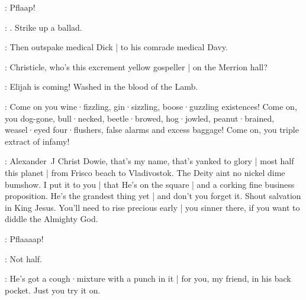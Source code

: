 :
Pflaap!

\stephen:
.
Strike up a ballad.

:
Then outspake medical Dick |
to his comrade medical Davy.

\bystander:
Christicle,
who's this excrement yellow gospeller |
on the Merrion hall?

\dowie:
Elijah is coming!
Washed in the blood of the Lamb.

\dowie:
Come on you wine·fizzling,
gin·sizzling,
boose·guzzling existences!
Come on,
you dog-gone,
bull·necked,
beetle·browed,
hog·jowled,
peanut·brained,
weasel·eyed four·flushers,
false alarms and excess baggage!
Come on,
you triple extract of infamy!

\dowie:
Alexander~J Christ Dowie,
that's my name,
that's yanked to glory |
most half this planet |
from Frisco beach to Vladivostok.
The Deity aint no nickel dime bumshow.
I put it to you |
that He's on the square |
and a corking fine business proposition.
He's the grandest thing yet |
and don't you forget it.
Shout salvation in King Jesus.
You'll need to rise precious early |
you sinner there,
if you want to diddle the Almighty God.

:
Pflaaaap!

\stephen:
Not half.

\dowie:
He's got a cough·mixture with a punch in it |
for you,
my friend,
in his back pocket.
Just you try it on.
